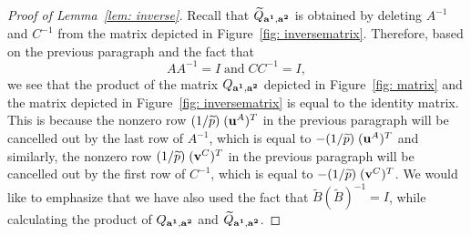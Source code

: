 \documentclass[11pt]{amsart}
\theoremstyle{plain}
\theoremstyle{definition}
\theoremstyle{remark}
\numberwithin{theorem}{section}
\begin{document}
\begin{proof} [Proof of Lemma~\ref{lem: inverse}]
Recall that $\widetilde{Q}_{{\bf a^1}, {\bf a^2}}$ is obtained by deleting $A^{-1}$ and $C^{-1}$ from the matrix depicted in Figure~\ref{fig: inversematrix}. Therefore, based on the previous paragraph and the fact that  $$AA^{-1}=I\;  \mbox{and} \; CC^{-1}=I,$$ we see that the product of the matrix $Q_{{\bf a^1}, {\bf a^2}}$ depicted in Figure~\ref{fig: matrix} and the matrix depicted in Figure~\ref{fig: inversematrix} is equal to the identity matrix. This is because the nonzero row  $(1/\widetilde{p})\; ({\bf u}^A)^T$ in the previous paragraph will be cancelled out by the last row of $A^{-1}$, which is equal to $-(1/\widetilde{p})\; ({\bf u}^A)^T$ and similarly, the nonzero row  $(1/\widetilde{p})\; ({\bf v}^C)^T$ in the previous paragraph will be cancelled out by the first row of $C^{-1}$, which is equal to $-(1/\widetilde{p})\; ({\bf v}^C)^T$. We would like to emphasize that we have also used the fact that $\widetilde{B}(\widetilde{B})^{-1}=I$, while calculating the product of $Q_{{\bf a^1}, {\bf a^2}}$ and $\widetilde{Q}_{{\bf a^1}, {\bf a^2}}$. 
\end{proof} 



\end{document}
